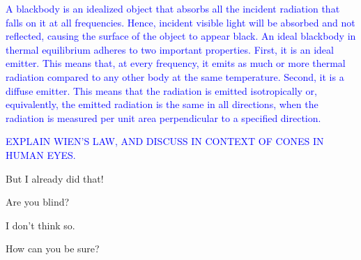 \documentclass[main.tex]{subfiles}
\begin{document}
\begin{tcolorbox}[sharp corners, colback=blue!30, colframe=blue!80!blue, title=Blackbody]
\par \textcolor{blue} {A blackbody is an idealized object that absorbs all the incident radiation that falls on it at all frequencies.  Hence, incident visible light will be absorbed and not reflected, causing the surface of the object to appear black.  An ideal blackbody in thermal equilibrium adheres to two important properties.  First, it is an ideal emitter.  This means that, at every frequency, it emits as much or more thermal radiation compared to any other body at the same temperature.  Second, it is a diffuse emitter.  This means that the radiation is emitted isotropically or, equivalently, the emitted radiation is the same in all directions, when the radiation is measured per unit area perpendicular to a specified direction.}
\end{tcolorbox}

\begin{tcolorbox}[sharp corners, colback=blue!30, colframe=blue!80!blue, title=Why is a star observed to have a given color?]
\par \textcolor{blue} {EXPLAIN WIEN'S LAW, AND DISCUSS IN CONTEXT OF CONES IN HUMAN EYES.}
\end{tcolorbox}


\par \Maia But I already did that!

\par \Pleione Are you blind?

\par \Maia I don't think so.

\par \Pleione How can you be sure?
\end{document}
